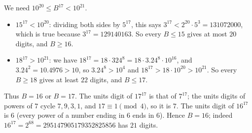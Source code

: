 We need $10^{20}\le B^{17}<10^{21}$.

\begin{itemize}
\item $15^{17}<10^{20}$: dividing both sides by $5^{17}$, this says $3^{17}<2^{20}\cdot5^3=131072000$, which is true because $3^{17}=129140163$. So every $B\le15$ gives at most $20$ digits, and $B\ge16$.
\item $18^{17}>10^{21}$: we have $18^{17}=18\cdot324^8=18\cdot3.24^8\cdot10^{16}$, and $3.24^2=10.4976>10$, so $3.24^8>10^4$ and $18^{17}>18\cdot10^{20}>10^{21}$. So every $B\ge18$ gives at least $22$ digits, and $B\le17$.
\end{itemize}
Thus $B=16$ or $B=17$. The units digit of $17^{17}$ is that of $7^{17}$; the units digits of powers of $7$ cycle $7,9,3,1$, and $17\equiv1\pmod4$, so it is $7$. The units digit of $16^{17}$ is $6$ (every power of a number ending in $6$ ends in $6$). Hence $B=\boxed{16}$; indeed $16^{17}=2^{68}=295147905179352825856$ has $21$ digits.

